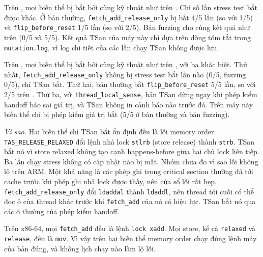 Trên , mọi biến thể bị bắt bởi cùng kỹ thuật như trên . Chỉ số lần
stress test bắt được khác. Ở bản thường, \texttt{fetch\_add\_release\_only} bị bắt 4/5 lần (so với
1/5) và \texttt{flip\_before\_reset} 1/5 lần (so với 2/5). Bản fuzzing cho cùng kết quả như trên
 (0/5 và 5/5). Kết quả TSan của máy này chỉ dựa trên dòng tóm tắt trong
\texttt{mutation.log}, vì log chi tiết của các lần chạy TSan không được lưu.

Trên , mọi biến thể bị bắt bởi cùng kỹ thuật như trên , với ba khác
biệt. Thứ nhất, \texttt{fetch\_add\_release\_only} không bị stress test bắt lần nào (0/5, fuzzing 0/5),
chỉ TSan bắt. Thứ hai, bản thường bắt \texttt{flip\_before\_reset} 5/5 lần, so với 2/5 trên
. Thứ ba, với \texttt{thread\_local\_sense}, bản TSan dừng ngay khi phép kiểm handoff
báo sai giá trị, và TSan không in cảnh báo nào trước đó. Trên máy này biến thể chỉ bị phép kiểm giá trị
bắt (5/5 ở bản thường và bản fuzzing).

\emph{Vì sao.} Hai biến thể chỉ TSan bắt ổn định đều là lỗi memory order. \texttt{TAS\_RELEASE\_RELAXED}
đổi lệnh nhả lock \texttt{stlrb} (store release) thành \texttt{strb}. TSan bắt nó vì store relaxed không
tạo cạnh happens-before giữa hai chủ lock liên tiếp. Ba lần chạy stress không có cập nhật nào bị mất.
Nhóm chưa đo vì sao lỗi không lộ trên ARM. Một khả năng là các phép ghi trong critical section thường
đã tới cache trước khi phép ghi nhả lock được thấy, nên cửa sổ lỗi rất hẹp.
\texttt{fetch\_add\_release\_only} đổi \texttt{ldaddal} thành \texttt{ldaddl}, nên thread tới cuối có
thể đọc ô của thread khác trước khi \texttt{fetch\_add} của nó có hiệu lực. TSan bắt nó qua các ô thường
của phép kiểm handoff.

Trên x86-64, mọi \texttt{fetch\_add} đều là lệnh \texttt{lock xadd}. Mọi store, kể cả \texttt{relaxed}
và \texttt{release}, đều là \texttt{mov}. Vì vậy trên  hai biến thể memory order chạy đúng
lệnh máy của bản đúng, và không lịch chạy nào làm lộ lỗi.

